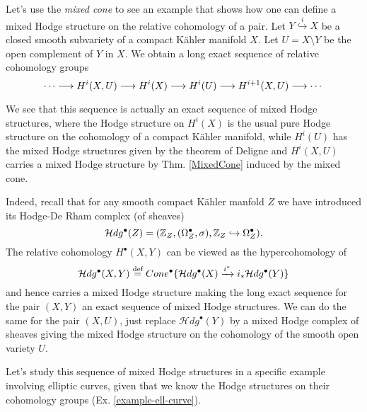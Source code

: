 \documentclass[../main.tex]{subfiles}
\begin{document}
Let's use the \emph{mixed cone} to see an example that shows how one can define a mixed Hodge structure on the relative cohomology of a pair.
Let $Y  \stackrel{i}\hookrightarrow X $ be a closed smooth subvariety of a compact K\"{a}hler manifold $X$. Let $U=X\setminus Y$ be the open complement of $Y$ in $X$. We obtain a long exact sequence of relative cohomology groups
\begin{equation}
\label{relative-coho-seq}
\cdots\longrightarrow H^i(X,U)\longrightarrow H^i(X)\longrightarrow H^i(U)\longrightarrow H^{i+1}(X,U)\longrightarrow \cdots
\end{equation}

We see that this sequence is actually an exact sequence of mixed Hodge structures, where the Hodge structure on $H^i(X)$ is the usual pure Hodge structure on the cohomology of a compact K\"{a}hler manifold, while $H^i(U)$ has the mixed Hodge structures given by the theorem of Deligne and $H^{i}(X,U)$ carries a mixed Hodge structure 
by Thm. \ref{MixedCone} induced by the mixed cone.

Indeed, recall that for any smooth compact K\"{a}hler manfold $Z$ we have introduced its Hodge-De Rham complex (of sheaves) 
\[
\mathcal{H}dg^\bullet(Z) = (\mathbb{Z}_Z, (\Omega_Z^\bullet, \sigma), \mathbb{Z}_Z \hookrightarrow \Omega_Z^\bullet).
\]
The relative cohomology $H^\bullet(X,Y)$ can be viewed as the hypercohomology of 
\[
\mathcal{H}dg^\bullet(X,Y) \stackrel{\text{def}}{=} Cone^\bullet \{ \mathcal{H}dg^\bullet(X) \xrightarrow{i^*} i_*\mathcal{H}dg^\bullet(Y) \}
\]
and hence carries a mixed Hodge structure making the long exact sequence for the pair $(X,Y)$ an exact sequence of mixed Hodge structures. We can do the same for the pair $(X,U)$, just replace $\mathcal{H}dg^\bullet(Y)$ by a mixed Hodge complex of sheaves giving the mixed Hodge structure on the cohomology of the smooth open variety $U$.

Let's study this sequence of mixed Hodge structures in a specific example involving elliptic curves, given that we know the Hodge structures on their cohomology groups (Ex. \ref{example-ell-curve}).
\end{document}
